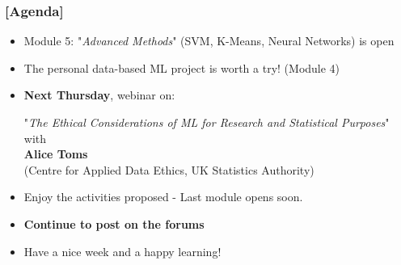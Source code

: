 \documentclass[xcolor=x11names,compress, aspectratio=169]{beamer}
\renewcommand{\(}{\begin{columns}}
\renewcommand{\)}{\end{columns}}
\newcommand{\<}[1]{\begin{column}{#1}}
\renewcommand{\>}{\end{column}}
\begin{document}
\begin{frame} %
\frametitle{\textcolor{brique}{[Agenda]}}
\pause
\begin{itemize}[<+->]
    \item Module 5: "\textit{Advanced Methods}" (SVM, K-Means, Neural Networks) is open
    \item The personal data-based ML  project is worth a try! (Module 4)
    \item \textbf{Next Thursday}, webinar on: \\ 
        \begin{center} 
            "\emph{The Ethical Considerations of ML for Research and Statistical Purposes}" with\\
             \textbf{ Alice Toms} \\
             (Centre for Applied Data Ethics, UK Statistics Authority)
         \end{center}
    \item Enjoy the activities proposed - Last module opens soon.
    \item \textbf{Continue to post on the forums}
    \item[] \begin{center}
                \Large \textcolor{siap}{ Have a nice week and a happy learning!}
            \end{center}
\end{itemize}
\end{frame}
\end{document}
